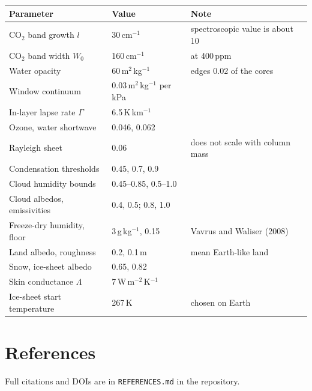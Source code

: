\documentclass[11pt,a4paper]{article}
\begin{document}
\begin{center}
\begin{tabular}{@{}lll@{}}
\toprule
Parameter & Value & Note \\
\midrule
CO$_2$ band growth $l$ & 30\,cm$^{-1}$ & spectroscopic value is about 10 \\
CO$_2$ band width $W_0$ & 160\,cm$^{-1}$ & at 400\,ppm \\
Water opacity & 60\,m$^2$\,kg$^{-1}$ & edges 0.02 of the cores \\
Window continuum & 0.03\,m$^2$\,kg$^{-1}$ per kPa & \\
In-layer lapse rate $\Gamma$ & 6.5\,K\,km$^{-1}$ & \\
Ozone, water shortwave & 0.046, 0.062 & \\
Rayleigh sheet & 0.06 & does not scale with column mass \\
Condensation thresholds & 0.45, 0.7, 0.9 & \\
Cloud humidity bounds & 0.45--0.85, 0.5--1.0 & \\
Cloud albedos, emissivities & 0.4, 0.5; 0.8, 1.0 & \\
Freeze-dry humidity, floor & 3\,g\,kg$^{-1}$, 0.15 & Vavrus and Waliser (2008) \\
Land albedo, roughness & 0.2, 0.1\,m & mean Earth-like land \\
Snow, ice-sheet albedo & 0.65, 0.82 & \\
Skin conductance $\Lambda$ & 7\,W\,m$^{-2}$\,K$^{-1}$ & \\
Ice-sheet start temperature & 267\,K & chosen on Earth \\
\bottomrule
\end{tabular}
\end{center}

\section{References}

Full citations and DOIs are in \texttt{REFERENCES.md} in the repository.
\end{document}
